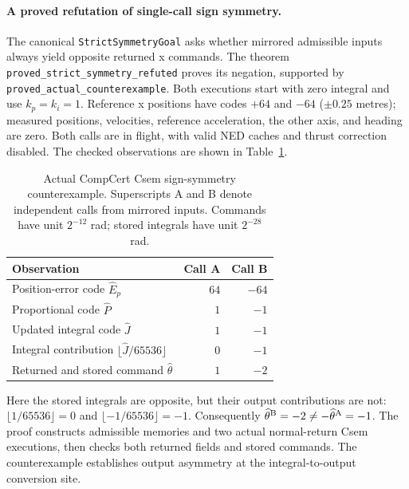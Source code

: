 \documentclass[manuscript, screen, review]{acmart}
\begin{document}
\paragraph{A proved refutation of single-call sign symmetry.}
The canonical \texttt{StrictSymmetryGoal} asks whether mirrored
admissible inputs always yield opposite returned x commands.
The theorem \texttt{proved\_\allowbreak strict\_\allowbreak symmetry\_\allowbreak refuted} proves its
negation, supported by \texttt{proved\_\allowbreak actual\_\allowbreak counterexample}.
Both executions start with zero integral and use $k_p=k_i=1$.
Reference x positions have codes $+64$ and $-64$ ($\pm0.25$ metres);
measured positions, velocities, reference acceleration, the other axis,
and heading are zero. Both calls are in flight, with valid NED caches
and thrust correction disabled. The checked observations are
shown in Table~\ref{tab:pid-sign-counterexample}.

\begin{table}[tb]
\caption{Actual CompCert Csem sign-symmetry counterexample.
Superscripts A and B denote independent calls from mirrored inputs.
Commands have unit $2^{-12}$ rad; stored integrals have unit $2^{-28}$ rad.}
\label{tab:pid-sign-counterexample}
\centering
\begin{tabular}{lrr}
\toprule
Observation & Call A & Call B\\
\midrule
Position-error code $\widehat E_p$ & $64$ & $-64$\\
Proportional code $\widehat P$ & $1$ & $-1$\\
Updated integral code $\widehat J$ & $1$ & $-1$\\
Integral contribution $\lfloor\widehat J/65536\rfloor$ & $0$ & $-1$\\
Returned and stored command $\widehat\theta$ & $1$ & $-2$\\
\bottomrule
\end{tabular}
\end{table}

Here the stored integrals are opposite, but their output contributions
are not: $\lfloor 1/65536\rfloor=0$ and
$\lfloor-1/65536\rfloor=-1$.
Consequently $\widehat\theta^{\rm B}=-2\ne
-\widehat\theta^{\rm A}=-1$.
The proof constructs admissible memories and two actual normal-return
Csem executions, then checks both returned fields and stored commands.
The counterexample establishes output asymmetry at the integral-to-output
conversion site.
\end{document}

